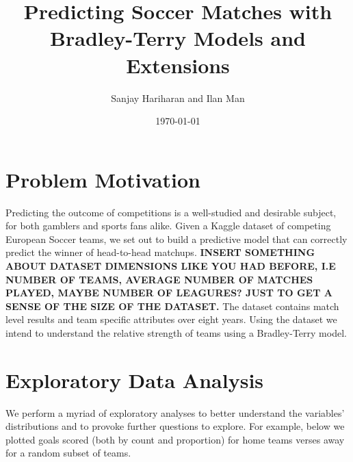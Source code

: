 \documentclass{article}
\title{Predicting Soccer Matches with Bradley-Terry Models and Extensions}
\author{Sanjay Hariharan and Ilan Man}
\date{\today}
\begin{document}
\maketitle

\section{Problem Motivation}

Predicting the outcome of competitions is a well-studied and desirable subject, for both gamblers and sports fans alike. Given a Kaggle dataset of competing European Soccer teams, we set out to build a predictive model that can correctly predict the winner of head-to-head matchups. \textbf{INSERT SOMETHING ABOUT DATASET DIMENSIONS LIKE YOU HAD BEFORE, I.E NUMBER OF TEAMS, AVERAGE NUMBER OF MATCHES PLAYED, MAYBE NUMBER OF LEAGURES? JUST TO GET A SENSE OF THE SIZE OF THE DATASET.}
The dataset contains match level results and team specific attributes over eight years. Using the dataset we intend to understand the relative strength of teams using a Bradley-Terry model. 

\section{Exploratory Data Analysis}

We perform a myriad of exploratory analyses to better understand the variables' distributions and to provoke further questions to explore. For example, below we plotted goals scored (both by count and proportion) for home teams verses away for a random subset of teams. \\
\end{document}
